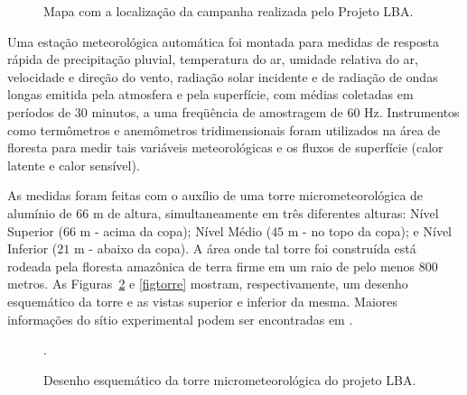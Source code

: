 \begin{figure}[ht]
	\caption{Mapa com a localização da campanha realizada pelo Projeto LBA.}
	\vspace{6mm}	%
	\begin{center}
	\end{center}
		\vspace{2mm}	%
	\legenda{}	%
	\label{rondonia}
\end{figure}

Uma estação meteorológica automática foi montada para medidas de resposta rápida de precipitação pluvial, temperatura do ar, umidade relativa do ar, velocidade e direção do vento, radiação solar incidente e de radiação de ondas longas emitida pela atmosfera e pela superfície, com médias coletadas em períodos de $30$ minutos, a uma freqüência de amostragem de $60$ Hz. Instrumentos como termômetros e anemômetros tridimensionais foram utilizados na área de floresta para medir tais variáveis meteorológicas e os fluxos de superfície (calor latente e calor sensível). 

As medidas foram feitas com o auxílio de uma torre micrometeorológica de alumínio de $66$ m de altura, simultaneamente em três diferentes alturas: Nível Superior ($66$ m - acima da copa); Nível Médio ($45$ m - no topo da copa); e Nível Inferior ($21$ m - abaixo da copa). 
A área onde tal torre foi construída está rodeada pela floresta amazônica de terra firme em um raio de pelo menos $800$ metros. As Figuras~\ref{torre} e \ref{figtorre} mostram, respectivamente, um desenho esquemático da torre e as vistas superior e inferior da mesma. Maiores informações do sítio experimental podem ser encontradas em .

\begin{figure}[ht]
	\caption{Desenho esquemático da torre micrometeorológica do projeto LBA.}
	\vspace{6mm}	%
	\begin{center}
	\end{center}
	\vspace{2mm}	%
	\legenda{}	%
	\label{torre}
	. 	%
\end{figure}

